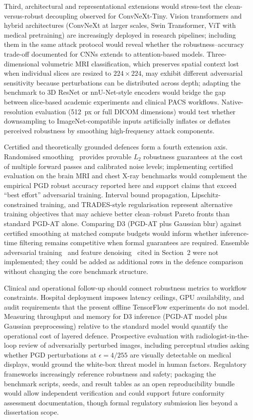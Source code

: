 \documentclass[12pt,a4paper,oneside]{report}
\begin{document}
Third, architectural and representational extensions would stress-test the clean-versus-robust decoupling observed for ConvNeXt-Tiny. Vision transformers and hybrid architectures (ConvNeXt at larger scales, Swin Transformer, ViT with medical pretraining) are increasingly deployed in research pipelines; including them in the same attack protocol would reveal whether the robustness--accuracy trade-off documented for CNNs extends to attention-based models. Three-dimensional volumetric MRI classification, which preserves spatial context lost when individual slices are resized to $224 \times 224$, may exhibit different adversarial sensitivity because perturbations can be distributed across depth; adapting the benchmark to 3D ResNet or nnU-Net-style encoders would bridge the gap between slice-based academic experiments and clinical PACS workflows. Native-resolution evaluation (512~px or full DICOM dimensions) would test whether downsampling to ImageNet-compatible inputs artificially inflates or deflates perceived robustness by smoothing high-frequency attack components.

Certified and theoretically grounded defences form a fourth extension axis. Randomised smoothing~\cite{cohen2019certified} provides provable $L_2$ robustness guarantees at the cost of multiple forward passes and calibrated noise levels; implementing certified evaluation on the brain MRI and chest X-ray benchmarks would complement the empirical PGD robust accuracy reported here and support claims that exceed ``best effort'' adversarial training. Interval bound propagation, Lipschitz-constrained training, and TRADES-style regularisation represent alternative training objectives that may achieve better clean--robust Pareto fronts than standard PGD-AT alone. Comparing D3 (PGD-AT plus Gaussian blur) against certified smoothing at matched compute budgets would inform whether inference-time filtering remains competitive when formal guarantees are required. Ensemble adversarial training~\cite{tramer2018ensemble} and feature denoising~\cite{xie2019feature} cited in Section~2 were not implemented; they could be added as additional rows in the defence comparison without changing the core benchmark structure.

Clinical and operational follow-up should connect robustness metrics to workflow constraints. Hospital deployment imposes latency ceilings, GPU availability, and audit requirements that the present offline TensorFlow experiments do not model. Measuring throughput and memory for D3 inference (PGD-AT model plus Gaussian preprocessing) relative to the standard model would quantify the operational cost of layered defence. Prospective evaluation with radiologist-in-the-loop review of adversarially perturbed images, including perceptual studies asking whether PGD perturbations at $\epsilon = 4/255$ are visually detectable on medical displays, would ground the white-box threat model in human factors. Regulatory frameworks increasingly reference robustness and safety; packaging the benchmark scripts, seeds, and result tables as an open reproducibility bundle would allow independent verification and could support future conformity assessment documentation, though formal regulatory submission lies beyond a dissertation scope.
\end{document}
